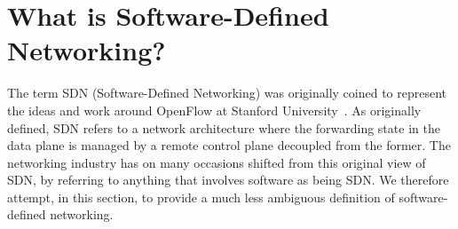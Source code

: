 \section{What is Software-Defined Networking?}
\label{fig:sec-sdn-what}

The term SDN (Software-Defined Networking)  was originally coined to represent 
the ideas and work around OpenFlow at Stanford University~\cite{greene2009}. 
As originally defined, SDN refers to a network architecture where the forwarding 
state in the data plane is managed by a remote control plane decoupled from the former.
The networking industry has on many occasions shifted from this original view of SDN, 
by referring to anything that involves software as being SDN. 
We therefore attempt, in this section, to provide a much less ambiguous definition of software-defined 
networking.

